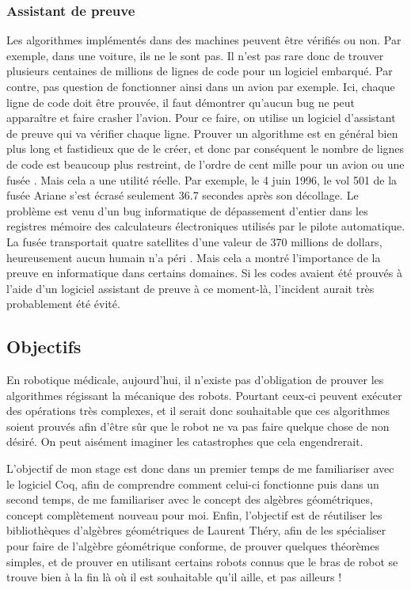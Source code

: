 \subsubsection{Assistant de preuve}

Les algorithmes implémentés dans des machines peuvent être vérifiés ou non. Par exemple, dans une voiture, ils ne le sont pas. Il n'est pas rare donc de trouver plusieurs centaines de millions de lignes de code pour un logiciel embarqué. Par contre, pas question de fonctionner ainsi dans un avion par exemple. Ici, chaque ligne de code doit être prouvée, il faut démontrer qu'aucun bug ne peut apparaître et faire crasher l'avion. Pour ce faire, on utilise un logiciel d'assistant de preuve qui va vérifier chaque ligne. Prouver un algorithme est en général bien plus long et fastidieux que de le créer, et donc par conséquent le nombre de lignes de code est beaucoup plus restreint, de l'ordre de cent mille pour un avion ou une fusée \cite{nblignescode}.  
Mais cela a une utilité réelle. Par exemple, le 4 juin 1996, le vol 501 de la fusée Ariane s'est écrasé seulement 36.7 secondes après son décollage. Le problème est venu d'un bug informatique de dépassement d'entier dans les registres mémoire des calculateurs électroniques utilisés par le pilote automatique. La fusée transportait quatre satellites d'une valeur de 370 millions de dollars, heureusement aucun humain n'a péri \cite{ariane}. Mais cela a montré l'importance de la preuve en informatique dans certains domaines. Si les codes avaient été prouvés à l'aide d'un logiciel assistant de preuve à ce moment-là, l'incident aurait très probablement été évité. 

\subsection{Objectifs}

En robotique médicale, aujourd'hui, il n'existe pas d'obligation de prouver les algorithmes régissant la mécanique des robots. Pourtant ceux-ci peuvent exécuter des opérations très complexes, et il serait donc souhaitable que ces algorithmes soient prouvés afin d'être sûr que le robot ne va pas faire quelque chose de non désiré. On peut aisément imaginer les catastrophes que cela engendrerait.  

L'objectif de mon stage est donc dans un premier temps de me familiariser avec le logiciel Coq, afin de comprendre comment celui-ci fonctionne puis dans un second temps, de me familiariser avec le concept des algèbres géométriques, concept complètement nouveau pour moi. Enfin, l'objectif est de réutiliser les bibliothèques d'algèbres géométriques de Laurent Théry, afin de les spécialiser pour faire de l'algèbre géométrique conforme, de prouver quelques théorèmes simples, et de prouver en utilisant certains robots connus que le bras de robot se trouve bien à la fin là où il est souhaitable qu'il aille, et pas ailleurs !

